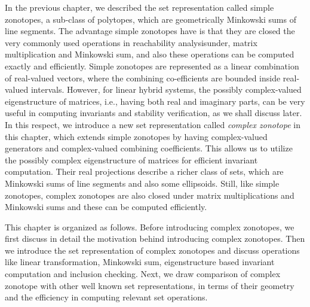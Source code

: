 In the previous chapter, we described the set representation called
simple zonotopes, a sub-class of polytopes, which are geometrically
Minkowski sums of line segments.  The advantage simple zonotopes have
is that they are closed the very commonly used operations in reachability analysisunder, matrix multiplication and Minkowski sum, and also 
these operations can be computed exactly and efficiently.  Simple zonotopes are
represented as a linear combination of real-valued vectors, where the
combining co-efficients are bounded inside real-valued intervals.
However, for linear hybrid systems, the possibly complex-valued
eigenstructure of matrices, i.e., having both real and imaginary
parts, can be very useful in computing invariants and stability
verification, as we shall discuss later.  In this respect, we
introduce a new set representation called \emph{complex zonotope} in
this chapter, which extends simple zonotopes by having complex-valued
generators and complex-valued combining coefficients.  This allows us
to utilize the possibly complex eigenstructure of matrices for
efficient invariant computation.  Their real projections describe a
richer class of sets, which are Minkowski sums of line segments and
also some ellipsoids.  Still, like simple zonotopes, complex zonotopes
are also closed under matrix multiplications and Minkowski sums and
these can be computed efficiently.

This chapter is organized as follows.  Before introducing complex
zonotopes, we first discuss in detail the motivation behind
introducing complex zonotopes.  Then we introduce the set
representation of complex zonotopes and discuss operations like linear
transformation, Minkowski sum, eigenstructure based invariant
computation and inclusion checking.  Next, we draw comparison of
complex zonotope with other well known set representations, in terms of
their geometry and the efficiency in computing relevant set operations.
